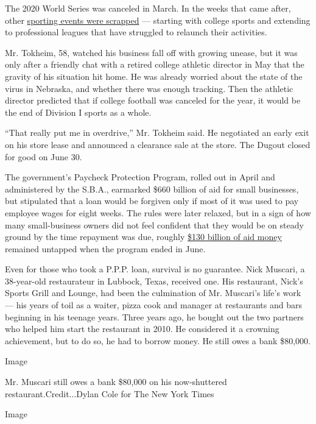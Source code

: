 The 2020 World Series was canceled in March. In the weeks that came
after, other
\href{https://www.nytimes3xbfgragh.onion/interactive/2020/06/19/sports/100-days-without-sports.html}{sporting
events were scrapped} --- starting with college sports and extending to
professional leagues that have struggled to relaunch their activities.

Mr. Tokheim, 58, watched his business fall off with growing unease, but
it was only after a friendly chat with a retired college athletic
director in May that the gravity of his situation hit home. He was
already worried about the state of the virus in Nebraska, and whether
there was enough tracking. Then the athletic director predicted that if
college football was canceled for the year, it would be the end of
Division I sports as a whole.

``That really put me in overdrive,'' Mr. Tokheim said. He negotiated an
early exit on his store lease and announced a clearance sale at the
store. The Dugout closed for good on June 30.

The government's Paycheck Protection Program, rolled out in April and
administered by the S.B.A., earmarked \$660 billion of aid for small
businesses, but stipulated that a loan would be forgiven only if most of
it was used to pay employee wages for eight weeks. The rules were later
relaxed, but in a sign of how many small-business owners did not feel
confident that they would be on steady ground by the time repayment was
due, roughly
\href{https://www.nytimes3xbfgragh.onion/2020/06/30/business/paycheck-protection-program-coronavirus.html}{\$130
billion of aid money} remained untapped when the program ended in June.

Even for those who took a P.P.P. loan, survival is no guarantee. Nick
Muscari, a 38-year-old restaurateur in Lubbock, Texas, received one. His
restaurant, Nick's Sports Grill and Lounge, had been the culmination of
Mr. Muscari's life's work --- his years of toil as a waiter, pizza cook
and manager at restaurants and bars beginning in his teenage years.
Three years ago, he bought out the two partners who helped him start the
restaurant in 2010. He considered it a crowning achievement, but to do
so, he had to borrow money. He still owes a bank \$80,000.

Image

Mr. Muscari still owes a bank \$80,000 on his now-shuttered
restaurant.Credit...Dylan Cole for The New York Times

Image

